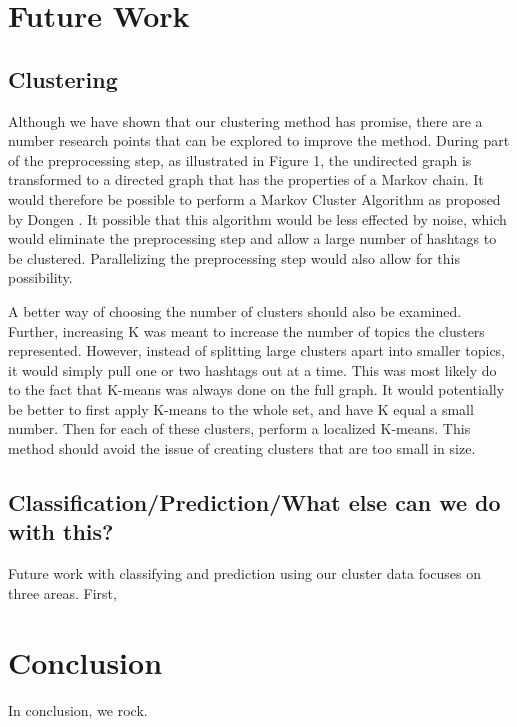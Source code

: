 \section{Future Work}

\subsection{Clustering}
Although we have shown that our clustering method has promise, there are a number research points that can be explored to improve the method. During part of the preprocessing step, as illustrated in Figure 1, the undirected graph is transformed to a directed graph that has the properties of a Markov chain. It would therefore be possible to perform a Markov Cluster Algorithm as proposed by Dongen \cite{Dongen2000}. It possible that this algorithm would be less effected by noise, which would eliminate the preprocessing step and allow a large number of hashtags to be clustered. Parallelizing the preprocessing step would also allow for this possibility. 

A better way of choosing the number of clusters should also be examined. Further, increasing K was meant to increase the number of topics the clusters represented. However, instead of splitting large clusters apart into smaller topics, it would simply pull one or two hashtags out at a time. This was most likely do to the fact that K-means was always done on the full graph. It would potentially be better to first apply K-means to the whole set, and have K equal a small number. Then for each of these clusters, perform a localized K-means. This method should avoid the issue of creating clusters that are too small in size. 


\subsection{Classification/Prediction/What else can we do with this?}
Future work with classifying and prediction using our cluster data focuses on three areas.  First, 


\section{Conclusion}
In conclusion, we rock.